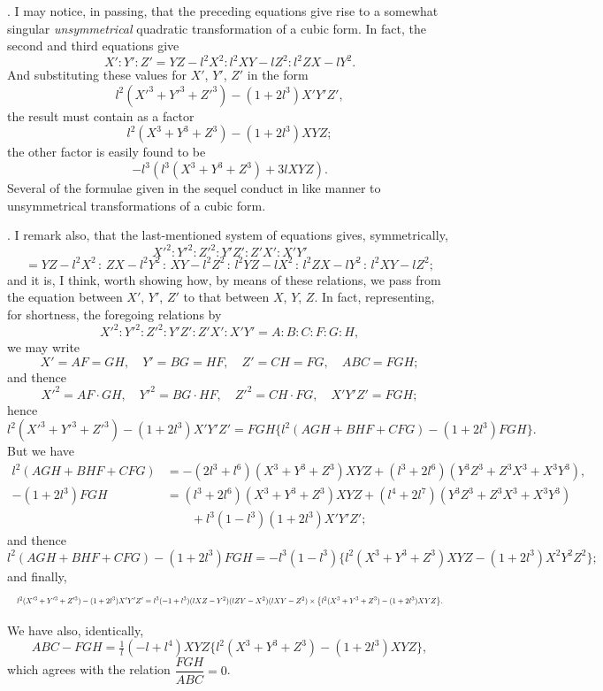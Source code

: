 \documentclass[11pt]{article}
\begin{document}
\medskip

. I may notice, in passing, that the preceding equations give rise to a somewhat singular \textit{unsymmetrical} quadratic transformation of a cubic form. In fact, the second and third equations give
\[
X' : Y' : Z' = Y Z - l^2 X^2 : l^2 X Y - l Z^2 : l^2 Z X - l Y^2.
\]
And substituting these values for $X'$, $Y'$, $Z'$ in the form
\[
l^2 (X'^3 + Y'^3 + Z'^3) - (1 + 2 l^3) X' Y' Z',
\]
the result must contain as a factor
\[
l^2 (X^3 + Y^3 + Z^3) - (1 + 2 l^3) X Y Z;
\]
the other factor is easily found to be
\[
- l^3 (l^3 (X^3 + Y^3 + Z^3) + 3 l X Y Z).
\]
Several of the formulae given in the sequel conduct in like manner to unsymmetrical transformations of a cubic form.

\medskip

. I remark also, that the last-mentioned system of equations gives, symmetrically,
\[
X'^2 : Y'^2 : Z'^2 : Y'Z' : Z'X' : X'Y'
\]
\[
= Y Z - l^2 X^2 \,:\, Z X - l^2 Y^2 \,:\, X Y - l^2 Z^2 \,:\, l^2 Y Z - l X^2 \,:\, l^2 Z X - l Y^2 \,:\, l^2 X Y - l Z^2;
\]
and it is, I think, worth showing how, by means of these relations, we pass from the equation between $X'$, $Y'$, $Z'$ to that between $X$, $Y$, $Z$. In fact, representing, for shortness, the foregoing relations by
\[
X'^2 : Y'^2 : Z'^2 : Y'Z' : Z'X' : X'Y' = A : B : C : F : G : H,
\]
we may write
\[
X' = AF = GH, \quad Y' = BG = HF, \quad Z' = CH = FG, \quad ABC = FGH;
\]
and thence
\[
X'^2 = AF \cdot GH, \quad Y'^2 = BG \cdot HF, \quad Z'^2 = CH \cdot FG, \quad X'Y'Z' = FGH;
\]
hence
\[
l^2 (X'^3 + Y'^3 + Z'^3) - (1 + 2 l^3) X' Y' Z' = FGH \bigl\{ l^2 (AGH + BHF + CFG) - (1 + 2 l^3) FGH \bigr\}.
\]
But we have
\begin{align*}
l^2 (AGH + BHF + CFG) &= -(2 l^3 + l^6)(X^3 + Y^3 + Z^3) X Y Z + (l^3 + 2 l^6)(Y^3 Z^3 + Z^3 X^3 + X^3 Y^3), \\
-(1 + 2 l^3) FGH &= (l^3 + 2 l^6)(X^3 + Y^3 + Z^3) X Y Z + (l^4 + 2 l^7)(Y^3 Z^3 + Z^3 X^3 + X^3 Y^3) \\
&\qquad + l^3 (1 - l^3)(1 + 2 l^3) X'Y'Z';
\end{align*}
and thence
\[
l^2 (AGH + BHF + CFG) - (1 + 2 l^3) FGH = -l^3 (1 - l^3)\bigl\{ l^2 (X^3 + Y^3 + Z^3) X Y Z - (1 + 2 l^3) X^2 Y^2 Z^2 \bigr\};
\]
and finally,
\[
\resizebox{\textwidth}{!}{$\displaystyle l^2 (X'^3 + Y'^3 + Z'^3) - (1 + 2 l^3) X'Y'Z' = l^3 (-1 + l^3)(l X Z - Y^2)(l Z Y - X^2)(l X Y - Z^2) \times \bigl\{ l^2 (X^3 + Y^3 + Z^3) - (1 + 2 l^3) X Y Z \bigr\}.$}
\]

We have also, identically,
\[
ABC - FGH = \tfrac{1}{l}(-l + l^4) X Y Z \bigl\{ l^2 (X^3 + Y^3 + Z^3) - (1 + 2 l^3) X Y Z \bigr\},
\]
which agrees with the relation $\dfrac{FGH}{ABC} = 0$.
\end{document}
